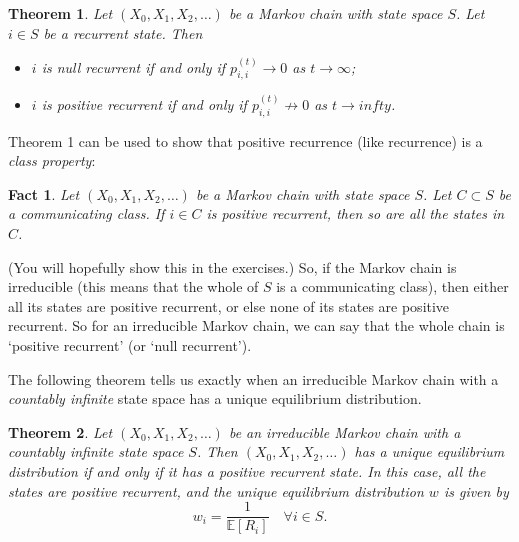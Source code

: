 \documentclass[11pt,a4paper]{article}
\newtheorem{theorem}{Theorem}
\newtheorem*{fact}{Fact}
\begin{document}
    \begin{theorem}
      Let $(X_0, X_1, X_2, \ldots)$ be a Markov chain with state space $S$. Let $i \in S$ be a recurrent state. Then
      \begin{itemize}
        \item  $i$ is null recurrent if and only if $p_{i,i}^{(t)} \to 0$ as $t \to \infty$;
        \item $i$ is positive recurrent if and only if $p_{i,i}^{(t)} \nrightarrow  0$ as $t \to infty$.
      \end{itemize}
    \end{theorem}
    Theorem 1 can be used to show that positive recurrence (like recurrence) is a \textit{class property}:
    \begin{fact}
      Let $(X_0, X_1, X_2, \ldots)$ be a Markov chain with state space $S$. Let $C \subset S$ be a communicating class. If $i \in C$ is positive recurrent, then so are all the states in $C$.
    \end{fact}
    (You will hopefully show this in the exercises.) So, if the Markov chain is irreducible (this means that the whole of $S$ is a communicating class), then either all its states are positive recurrent, or else none of its states are positive recurrent. So for an irreducible Markov chain, we can say that the whole chain is ‘positive recurrent’ (or ‘null recurrent’).\par
    The following theorem tells us exactly when an irreducible Markov chain with a \textit{countably infinite} state space has a unique equilibrium distribution.
    \begin{theorem}
      Let $(X_0, X_1, X_2, \ldots)$ be an irreducible Markov chain with a countably infinite state space $S$. Then $(X_0, X_1, X_2, \ldots)$ has a unique equilibrium distribution if and only if it has a positive recurrent state. In this case, all the states are positive recurrent, and the unique equilibrium distribution $w$ is given by
      $$w_i=\frac{1}{\mathbb{E}[R_i]} \quad \forall i \in S.$$
    \end{theorem}
\end{document}
